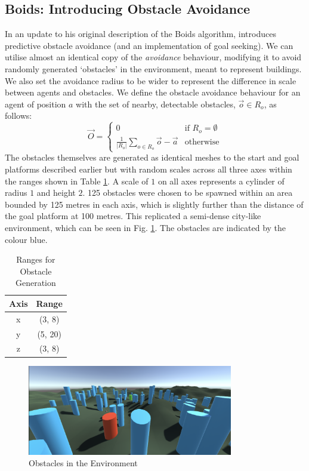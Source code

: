 \documentclass[12pt]{article}
\begin{document}
\subsection{Boids: Introducing Obstacle Avoidance}
In an update to his original description of the Boids algorithm, \citet{boids95} introduces predictive obstacle avoidance (and an implementation of goal seeking). We can utilise almost an identical copy of the \emph{avoidance} behaviour, modifying it to avoid randomly generated `obstacles' in the environment, meant to represent buildings. We also set the avoidance radius to be wider to represent the difference in scale between agents and obstacles. We define the obstacle avoidance behaviour for an agent of position $a$ with the set of nearby, detectable obstacles, $\vec{o} \in R_o$, as follows:
\begin{equation}
    \vec{O} = 
    \begin{cases}
    0 & \text{if } R_o = \emptyset \\
    \frac{1}{|R_o|}\sum_{o \in R_o} \vec{o} - \vec{a} & \text{otherwise}
    \end{cases}
\end{equation}
The obstacles themselves are generated as identical meshes to the start and goal platforms described earlier but with random scales across all three axes within the ranges shown in Table \ref{tab:obstacle-ranges}. A scale of $1$ on all axes represents a cylinder of radius $1$ and height $2$. 125 obstacles were chosen to be spawned within an area bounded by 125 metres in each axis, which is slightly further than the distance of the goal platform at 100 metres. This replicated a semi-dense city-like environment, which can be seen in Fig. \ref{fig:obstacles}. The obstacles are indicated by the colour blue.

\begin{table}[ht]
    \centering
    \begin{tabular}{|c|c|}
        \hline
        Axis & Range \\
        \hline
        x & (3, 8) \\
        \hline
        y & (5, 20) \\
        \hline
        z & (3, 8) \\
        \hline
    \end{tabular}
    \caption{Ranges for Obstacle Generation}
    \label{tab:obstacle-ranges}
\end{table}

\begin{figure}[ht]
    \centering
    \includegraphics[width=0.8\textwidth]{obstacles.png}
    \caption{Obstacles in the Environment}
    \label{fig:obstacles}
\end{figure}
\end{document}
